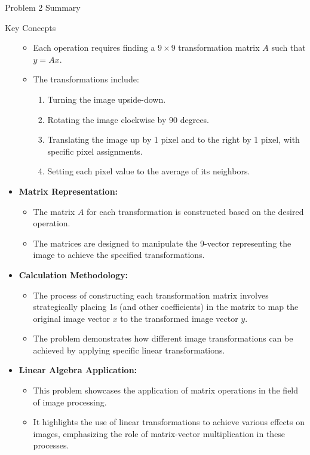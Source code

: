 \begin{summary}{Problem 2 Summary}
\begin{statement}{Key Concepts}
\begin{itemize}
\begin{itemize}
                \item Each operation requires finding a $9 \times 9$ transformation matrix $A$ such that $y = Ax$.
                \item The transformations include:
                \begin{enumerate}
                    \item Turning the image upside-down.
                    \item Rotating the image clockwise by 90 degrees.
                    \item Translating the image up by 1 pixel and to the right by 1 pixel, with specific pixel assignments.
                    \item Setting each pixel value to the average of its neighbors.
                \end{enumerate}
            \end{itemize}
            \item \textbf{Matrix Representation:}
            \begin{itemize}
                \item The matrix $A$ for each transformation is constructed based on the desired operation.
                \item The matrices are designed to manipulate the 9-vector representing the image to achieve the specified transformations.
            \end{itemize}
            \item \textbf{Calculation Methodology:}
            \begin{itemize}
                \item The process of constructing each transformation matrix involves strategically placing 1s (and other coefficients) in the matrix to map the original image vector $x$ to the 
                transformed image vector $y$.
                \item The problem demonstrates how different image transformations can be achieved by applying specific linear transformations.
            \end{itemize}
            \item \textbf{Linear Algebra Application:}
            \begin{itemize}
                \item This problem showcases the application of matrix operations in the field of image processing.
                \item It highlights the use of linear transformations to achieve various effects on images, emphasizing the role of matrix-vector multiplication in these processes.

\end{itemize}
\end{itemize}
\end{statement}
\end{summary}
